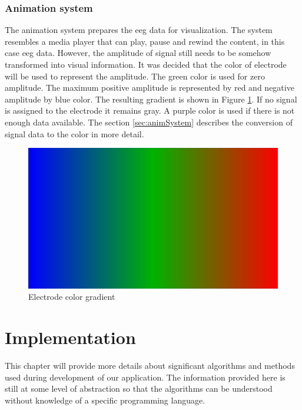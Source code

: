 \subsection{Animation system}
\label{ssec:concAnimSystem}
The animation system prepares the \gls{eeg} data for visualization. The system resembles a media player that can play, pause and rewind the content, in this case \gls{eeg} data. However, the amplitude of signal still needs to be somehow transformed into visual information. It was decided that the color of electrode will be used to represent the amplitude. The green color is used for zero amplitude. The maximum positive amplitude is represented by red and negative amplitude by blue color. The resulting gradient is shown in Figure \ref{fig:ElColorGradient}. If no signal is assigned to the electrode it remains gray. A purple color is used if there is not enough data available. The section \ref{sec:animSystem} describes the conversion of signal data to the color in more detail.

\begin{figure}[htb]
	\centering
	\includegraphics[width=0.8\linewidth, height=0.05\textheight]{fig/gradient.pdf}
	\caption{Electrode color gradient}
	\label{fig:ElColorGradient}
\end{figure}

\chapter{Implementation}
\label{implementation}
This chapter will provide more details about significant algorithms and methods used during  development of our application. The information provided here is still at some level of abstraction 
so that the algorithms can be understood without knowledge of a specific programming language. 

